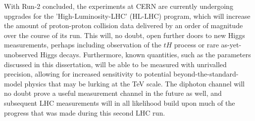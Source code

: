 With Run-2 concluded, the experiments at CERN are currently undergoing upgrades for the 'High-Luminosity-LHC' (HL-LHC) program, which will increase the amount of proton-proton collision data delivered by an order of magnitude over the course of its run. This will, no doubt, open further doors to new Higgs measurements, perhaps including observation of the $tH$ process or rare as-yet-unobserved Higgs decays. Furthermore, known quantities, such as the parameters discussed in this dissertation, will be able to be measured with unrivalled precision, allowing for increased sensitivity to potential beyond-the-standard-model physics that may be lurking at the TeV scale. The diphoton channel will no doubt prove a useful measurement channel in the future as well, and subsequent LHC measurements will in all likelihood build upon much of the progress that was made during this second LHC run.